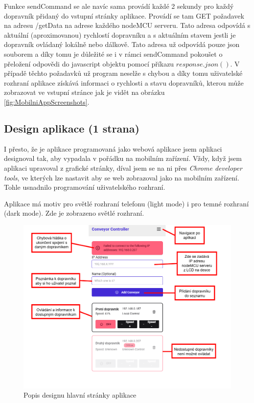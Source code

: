 Funkce sendCommand se ale navíc sama provádí každé 2 sekundy pro každý dopravník přidaný do vstupní stránky aplikace. Provádí se tam GET požadavek na adresu /getData na adrese každého nodeMCU serveru. Tato adresa odpovídá s aktuální (aproximovanou) rychlostí dopravníku a s aktuálním stavem jestli je dopravník ovládaný lokálně nebo dálkově. Tato adresa už odpovídá pouze json souborem a díky tomu je důležité se i v rámci sendCommand pokoušet o přeložení odpovědi do javascript objektu pomocí příkazu $response.json()$. V případě těchto požadavků už program neselže s chybou a díky tomu uživatelské rozhraní aplikace získává informaci o rychlosti a stavu dopravníků, kterou může zobrazovat ve vstupní stránce jak je vidět na obrázku \ref{fig:MobilniAppScreenshots}.

\subsection{Design aplikace (1 strana)}

I přesto, že je aplikace programovaná jako webová aplikace jsem aplikaci designoval tak, aby vypadala v pořádku na mobilním zařízení. Vždy, když jsem aplikaci upravoval z grafické stránky, díval jsem se na ni přes \textit{Chrome developer tools}, ve kterých lze nastavit aby se web zobrazoval jako na mobilním zařízení. Tohle usnadnilo programování uživatelského rozhraní.

Aplikace má motiv pro světlé rozhraní telefonu (light mode) i pro temné rozhraní (dark mode). Zde je zobrazeno světlé rozhraní.

\begin{figure}[H]
    \centering
    \includegraphics[width=0.9\linewidth]{images/LandingPage_Annot.png}
    \caption{Popis designu hlavní stránky aplikace}
    \label{fig:LandingPageAnnotated}
\end{figure}

